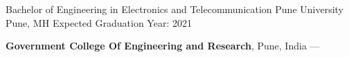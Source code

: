 
\begin{cventries}
  \cventry
    {Bachelor of Engineering in Electronics and Telecommunication} %
    {Pune University} %
    {Pune, MH} %
    {Expected Graduation Year: 2021} %
    {
      \begin{cvitems} %
         \item {\textbf{Government College Of Engineering and Research}, Pune, India --- }
         \vspace{0.5mm}
      \end{cvitems}
    }
\end{cventries}
